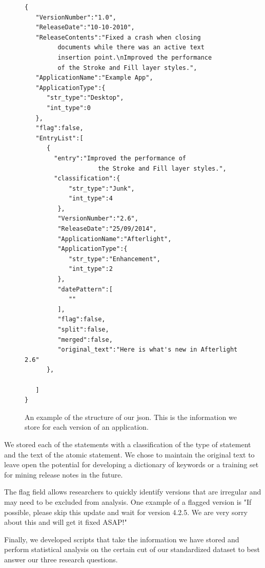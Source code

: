 \documentclass{acm_proc_article-sp}
\begin{document}
\begin{figure}
\begin{verbatim}
{  
   "VersionNumber":"1.0",
   "ReleaseDate":"10-10-2010",
   "ReleaseContents":"Fixed a crash when closing
   		 documents while there was an active text 
   		 insertion point.\nImproved the performance 
   		 of the Stroke and Fill layer styles.",
   "ApplicationName":"Example App",
   "ApplicationType":{  
      "str_type":"Desktop",
      "int_type":0
   },
   "flag":false,
   "EntryList":[  
      {  
 		"entry":"Improved the performance of 
 		         	the Stroke and Fill layer styles.",
        "classification":{  
            "str_type":"Junk",
            "int_type":4
         },
         "VersionNumber":"2.6",
         "ReleaseDate":"25/09/2014",
         "ApplicationName":"Afterlight",
         "ApplicationType":{  
            "str_type":"Enhancement",
            "int_type":2
         },
         "datePattern":[  
            ""
         ],
         "flag":false,
         "split":false,
         "merged":false,
         "original_text":"Here is what's new in Afterlight 2.6"
      },
    
   ]
}
\end{verbatim}
\caption{An example of the structure of our json. This is the information we store for each version of an application.}
\label{fig:jsonEx}
\end{figure}

We stored each of the statements with a classification of the type of statement and the text of the atomic statement.
We chose to maintain the original text to leave open the potential for developing a dictionary of keywords or a training set for mining release notes in the future.

The flag field allows researchers to quickly identify versions that are irregular and may need to be excluded from analysis.
One example of a flagged version is "If possible, please skip this update and wait for version 4.2.5. We are very sorry about this and will get it fixed ASAP!"

Finally, we developed scripts that take the information we have stored and perform statistical analysis on the certain cut of our standardized dataset to best answer our three research questions.
\end{document}
